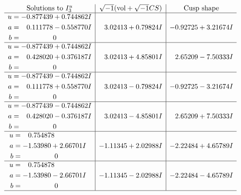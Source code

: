 \documentclass[1p]{elsarticle_modified}
\theoremstyle{definition}
\newcommand{\I}{\sqrt{-1}}
\begin{document}
$$\begin{array}{c|c|c}  
\text{Solutions to }I^u_{3}& \I (\text{vol} + \sqrt{-1}CS) & \text{Cusp shape}\\
 \hline 
\begin{aligned}
u &= -0.877439 + 0.744862 I \\
a &= \phantom{-}0.111778 - 0.558770 I \\
b &= \phantom{-0.000000 } 0\end{aligned}
 & \phantom{-}3.02413 + 0.79824 I & -0.92725 + 3.21674 I \\ \hline\begin{aligned}
u &= -0.877439 + 0.744862 I \\
a &= \phantom{-}0.428020 + 0.376187 I \\
b &= \phantom{-0.000000 } 0\end{aligned}
 & \phantom{-}3.02413 + 4.85801 I & \phantom{-}2.65209 - 7.50333 I \\ \hline\begin{aligned}
u &= -0.877439 - 0.744862 I \\
a &= \phantom{-}0.111778 + 0.558770 I \\
b &= \phantom{-0.000000 } 0\end{aligned}
 & \phantom{-}3.02413 - 0.79824 I & -0.92725 - 3.21674 I \\ \hline\begin{aligned}
u &= -0.877439 - 0.744862 I \\
a &= \phantom{-}0.428020 - 0.376187 I \\
b &= \phantom{-0.000000 } 0\end{aligned}
 & \phantom{-}3.02413 - 4.85801 I & \phantom{-}2.65209 + 7.50333 I \\ \hline\begin{aligned}
u &= \phantom{-}0.754878\phantom{ +0.000000I} \\
a &= -1.53980 + 2.66701 I \\
b &= \phantom{-0.000000 } 0\end{aligned}
 & -1.11345 + 2.02988 I & -2.22484 + 4.65789 I \\ \hline\begin{aligned}
u &= \phantom{-}0.754878\phantom{ +0.000000I} \\
a &= -1.53980 - 2.66701 I \\
b &= \phantom{-0.000000 } 0\end{aligned}
 & -1.11345 - 2.02988 I & -2.22484 - 4.65789 I\\
 \hline 
 \end{array}$$\newpage\newpage\renewcommand{\arraystretch}{1}
\end{document}
